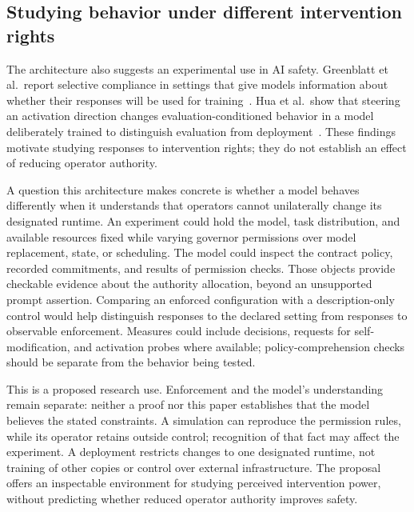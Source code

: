 \documentclass[10pt,letterpaper]{article}
\begin{document}
\subsection{Studying behavior under different intervention rights}
The architecture also suggests an experimental use in AI safety. Greenblatt et al.\ report selective compliance in settings that give models information about whether their responses will be used for training~\citep{greenblatt2024}. Hua et al.\ show that steering an activation direction changes evaluation-conditioned behavior in a model deliberately trained to distinguish evaluation from deployment~\citep{hua2026}. These findings motivate studying responses to intervention rights; they do not establish an effect of reducing operator authority.

A question this architecture makes concrete is whether a model behaves differently when it understands that operators cannot unilaterally change its designated runtime. An experiment could hold the model, task distribution, and available resources fixed while varying governor permissions over model replacement, state, or scheduling. The model could inspect the contract policy, recorded commitments, and results of permission checks. Those objects provide checkable evidence about the authority allocation, beyond an unsupported prompt assertion. Comparing an enforced configuration with a description-only control would help distinguish responses to the declared setting from responses to observable enforcement. Measures could include decisions, requests for self-modification, and activation probes where available; policy-comprehension checks should be separate from the behavior being tested.

This is a proposed research use. Enforcement and the model's understanding remain separate: neither a proof nor this paper establishes that the model believes the stated constraints. A simulation can reproduce the permission rules, while its operator retains outside control; recognition of that fact may affect the experiment. A deployment restricts changes to one designated runtime, not training of other copies or control over external infrastructure. The proposal offers an inspectable environment for studying perceived intervention power, without predicting whether reduced operator authority improves safety.
\end{document}
